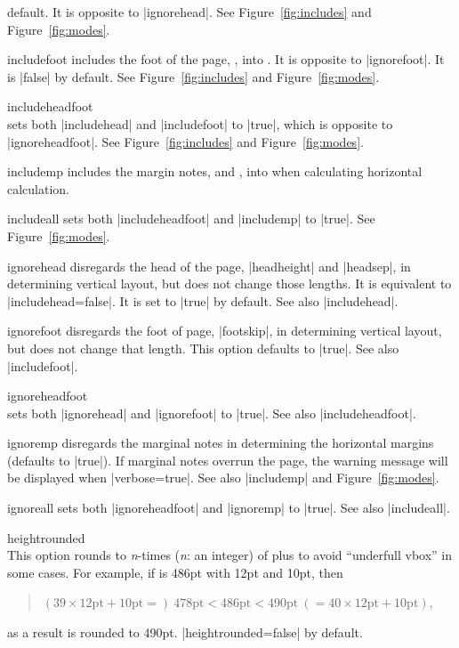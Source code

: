 \begin{Options}
   default. It is opposite to |ignorehead|. See
   Figure~\ref{fig:includes} and Figure~\ref{fig:modes}.
\item[includefoot] includes the foot of the page, ,
   into . It is opposite to |ignorefoot|.
   It is |false| by default. See Figure~\ref{fig:includes} and
   Figure~\ref{fig:modes}.
\item[includeheadfoot]~\\ 
   sets both |includehead| and |includefoot| to |true|, which is opposite
   to |ignoreheadfoot|. See Figure~\ref{fig:includes} and
   Figure~\ref{fig:modes}.
\item[includemp] includes the margin notes,  
   and , into  when calculating horizontal
   calculation.
\item[includeall] sets both |includeheadfoot| and |includemp| to
   |true|. See Figure~\ref{fig:modes}.
\item[ignorehead] disregards the head of the page,
   |headheight| and |headsep|, in determining vertical layout, but does not
   change those lengths. It is equivalent to |includehead=false|. It is set
   to |true| by default. See also |includehead|.
\item[ignorefoot] disregards the foot of page, |footskip|,
   in determining vertical layout, but does not change that length.
   This option defaults to |true|. See also |includefoot|.
\item[ignoreheadfoot]~\\ sets both |ignorehead| and |ignorefoot|
   to |true|. See also |includeheadfoot|.
\item[ignoremp] disregards the marginal notes in determining the
   horizontal margins (defaults to |true|). If marginal notes overrun
   the page, the warning message will be displayed when |verbose=true|.
   See also |includemp| and Figure~\ref{fig:modes}.
\item[ignoreall] sets both |ignoreheadfoot| and |ignoremp| to |true|. 
   See also |includeall|.
\item[heightrounded]~\\
   This option rounds  to \textit{n}-times (\textit{n}:
   an integer) of  plus  to avoid 
   ``underfull vbox'' in some cases. For example, if  is
   486pt with  12pt and  10pt, then
   \begin{quote}
     $(39\times12\textrm{pt}+10\textrm{pt}=)\: 478\textrm{pt}
      < 486\textrm{pt} < 
     490\textrm{pt} \:(=40\times12\textrm{pt}+10\textrm{pt})$,
   \end{quote}
   as a result  is rounded to 490pt. |heightrounded=false|
   by default.
\end{Options}

